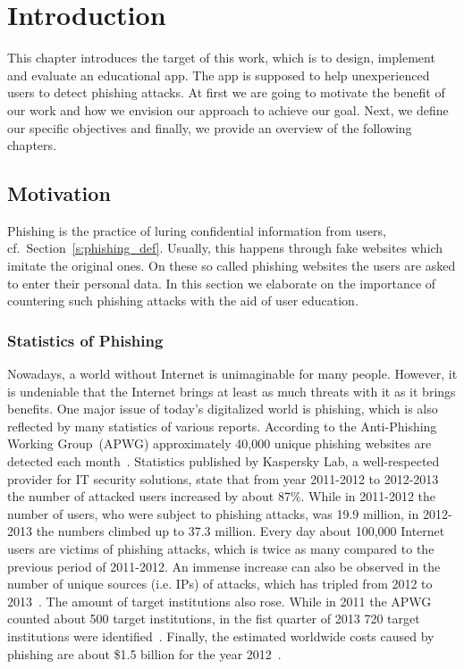 \section{Introduction}
\label{s:introduction}
This chapter introduces the target of this work, which is to design, implement and evaluate an educational app. The app is supposed to help unexperienced users to detect phishing attacks. At first we are going to motivate the benefit of our work and how we envision our approach to achieve our goal. Next, we define our specific objectives and finally, we provide an overview of the following chapters.

\subsection{Motivation}
Phishing is the practice of luring confidential information from users, cf.~Section~\ref{s:phishing_def}. Usually, this happens through fake websites which imitate the original ones. On these so called phishing websites the users are asked to enter their personal data. In this section we elaborate on the importance of countering such phishing attacks with the aid of user education. 

\subsubsection{Statistics of Phishing}
\label{s:stats}
Nowadays, a world without Internet is unimaginable for many people. However, it is undeniable that the Internet brings at least as much threats with it as it brings benefits. One major issue of today's digitalized world is phishing, which is also reflected by many statistics of various reports. According to the Anti-Phishing Working Group~(APWG) approximately 40,000 unique phishing websites are detected each month~\cite{antiphishingtrendreport2013}. Statistics published by Kaspersky Lab, a well-respected provider for IT security solutions, state that from year 2011-2012 to 2012-2013 the number of attacked users increased by about 87\%. While in 2011-2012 the number of users, who were subject to phishing attacks, was 19.9 million, in 2012-2013 the numbers climbed up to 37.3 million. Every day about 100,000 Internet users are victims of phishing attacks, which is twice as many compared to the previous period of 2011-2012. An immense increase can also be observed in the number of unique sources (i.e. IPs) of attacks, which has tripled from 2012 to 2013~\cite{kasperskyreport2013}. The amount of target institutions also rose. While in 2011 the APWG counted about 500 target institutions, in the fist quarter of 2013 720 target institutions were identified~\cite{antiphishingglobalreport2013}. Finally, the estimated worldwide costs caused by phishing are about \$1.5 billion for the year 2012~\cite{rsa2013}.



